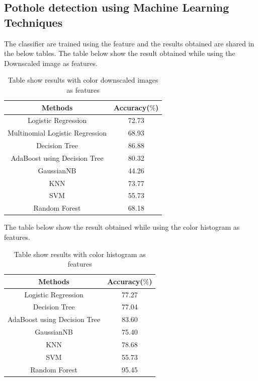 \documentclass[journal]{IEEEtran}
\begin{document}
\subsection{Pothole detection using Machine Learning Techniques}

The classifier are trained using the feature and the results obtained are shared in the below tables.
The table below show the result obtained while using the Downscaled image as features.
\begin{center}
\begin{table}[h!]
\centering
\begin{tabular}{ |c|c| } 
 \hline
 \rowcolor{gray}
 Methods & Accuracy($\%$)  \\ 
 \hline
 Logistic Regression & 72.73 \\
 \hline
 Multinomial Logistic Regression & 68.93\\
 \hline
 Decision Tree & 86.88 \\ 
 \hline
 AdaBoost using Decision Tree & 80.32  \\ 
 \hline
 GaussianNB & 44.26 \\
 \hline
 KNN & 73.77\\
 \hline
 SVM & 55.73\\
 \hline
 Random Forest & 68.18\\
 \hline
\end{tabular}
\caption{Table show results with color downscaled images as features}
\label{table:1}
\end{table}
\end{center}

The table below show the result obtained while using the color histogram as features.
\begin{center}
\begin{table}[h!]
\centering
\begin{tabular}{ |c|c| } 
 \hline
 \rowcolor{gray}
 Methods & Accuracy($\%$)  \\ 
 \hline
 Logistic Regression & 77.27\\
 \hline
 Decision Tree & 77.04 \\ 
 \hline
 AdaBoost using Decision Tree & 83.60  \\ 
 \hline
 GaussianNB & 75.40 \\
 \hline
 KNN & 78.68\\
 \hline
 SVM & 55.73\\
 \hline
 Random Forest & 95.45\\
 \hline
\end{tabular}
\caption{Table show results with color histogram as features}
\label{table:1}
\end{table}
\end{center}
\end{document}
